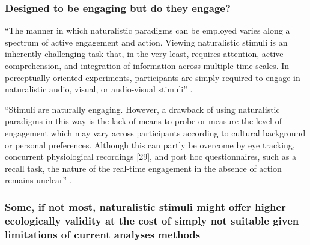 \subsubsection{Designed to be engaging but do they engage?}







%
``The manner in which naturalistic paradigms can be employed varies along a
spectrum of active engagement and action.
%
Viewing naturalistic stimuli is an inherently challenging task that, in the very
least, requires attention, active comprehension, and integration of information
across multiple time scales.
%
In perceptually oriented experiments, participants are simply required to engage
in naturalistic audio, visual, or audio-visual stimuli''
\citep{sonkusare2019naturalistic}.

%
``Stimuli are naturally engaging.
%
However, a drawback of using naturalistic paradigms in this way is the lack of
means to probe or measure the level of engagement which may vary across
participants according to cultural background or personal preferences.
%
Although this can partly be overcome by eye tracking, concurrent physiological
recordings [29], and post hoc questionnaires, such as a recall task, the nature
of the real-time engagement in the absence of action remains unclear''
\citep{sonkusare2019naturalistic}.



\subsubsection{Some, if not most, naturalistic stimuli might offer higher
ecologically validity at the cost of simply not suitable given limitations of
current analyses methods}


